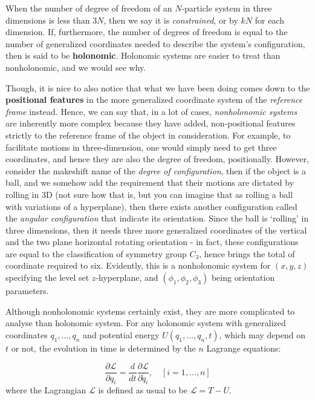 When the number of degree of freedom of an $N$-particle system in three dimensions is less than $3N$, then we say it is \textit{constrained}, or by $kN$ for each dimension. If, furthermore, the number of degrees of freedom is equal to the number of generalized coordinates needed to describe the system's configuration, then is said to be \textbf{holonomic}. Holonomic systems are easier to treat than nonholonomic, and we would see why. 

Though, it is nice to also notice that what we have been doing comes down to the \textbf{positional features} in the more generalized coordinate system of the \textit{reference frame} instead. Hence, we can say that, in a lot of cases, \textit{nonholonomic systems} are inherently more complex because they have added, non-positional features strictly to the reference frame of the object in consideration. For example, to facilitate motions in three-dimension, one would simply need to get three coordinates, and hence they are also the degree of freedom, positionally. However, consider the makeshift name of the \textit{degree of configuration}, then if the object is a ball, and we somehow add the requirement that their motions are dictated by rolling in 3D (not sure how that is, but you can imagine that as rolling a ball with variations of a hyperplane), then there exists another configuration called the \textit{angular configuration} that indicate its orientation. Since the ball is `rolling' in three dimensions, then it needs three more generalized coordinates of the vertical and the two plane horizontal rotating orientation - in fact, these configurations are equal to the classification of symmetry group $C_{3}$, hence brings the total of coordinate required to six. Evidently, this is a nonholonomic system for $(x,y,z)$ specifying the level set $z$-hyperplane, and $(\phi_{1},\phi_{2},\phi_{3})$ being orientation parameters.

Although nonholonomic systems certainly exist, they are more complicated to analyse than holonomic system. For any holonomic system with generalized coordinates $q_{1},\dots,q_{n}$ and potential energy $U(q_{1},\dots,q_{n},t)$, which may depend on $t$ or not, the evolution in time is determined by the $n$ Lagrange equations: 

\begin{equation}
  \frac{\partial \mathcal{L}}{\partial q_{i}} = \frac{d}{dt} \frac{\partial \mathcal{L}}{\partial \dot{q}_{i}}, \quad [i=1,\dots,n]
\end{equation}
where the Lagrangian $\mathcal{L}$ is defined as usual to be $\mathcal{L}=T-U$. 